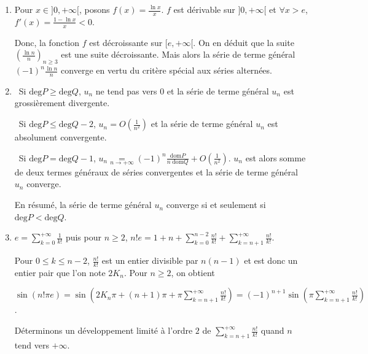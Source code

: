 {{\begin{enumerate}
Ainsi, la série de terme général $u_n$ vérifie le critère de \textsc{Cauchy} et est donc convergente.
Il en est de même des séries de termes généraux respectifs  $\frac{\cos(n\alpha)}{n}=\text{Re}\left(\frac{e^{in\alpha}}{n}\right)$ et $\frac{\sin(n\alpha)}{n}=\text{Im}\left(\frac{e^{in\alpha}}{n}\right)$.

\item  Pour $x\in]0,+\infty[$, posons $f(x)=\frac{\ln x}{x}$. $f$ est dérivable sur $]0,+\infty[$ et $\forall x>e$, $f'(x)=\frac{1-\ln x}{x}< 0$.

Donc, la fonction $f$ est décroissante sur $[e,+\infty[$. On en déduit que la suite $\left(\frac{\ln n}{n}\right)_{n\geqslant3}$ est une suite décroissante. Mais alors la série de terme général $(-1)^n\frac{\ln n}{n}$ converge en vertu du critère spécial aux séries alternées.

\item  \textbullet~Si $\text{deg}P\geqslant\text{deg}Q$, $u_n$ ne tend pas vers $0$ et la série de terme général $u_n$ est grossièrement divergente.

\textbullet~Si $\text{deg}P\leqslant\text{deg}Q - 2$, $u_n=O\left(\frac{1}{n^2}\right)$ et la série de terme général $u_n$ est absolument convergente.

\textbullet~Si $\text{deg}P =\text{deg}Q - 1$, $u_n\underset{n\rightarrow+\infty}{=}(-1)^n\frac{\text{dom}P}{n\;\text{dom}Q}+O\left(\frac{1}{n^2}\right)$. $u_n$ est alors somme de deux termes généraux de séries convergentes et la série de terme général $u_n$ converge.

En résumé, la série de terme général $u_n$ converge si et seulement si $\text{deg}P <\text{deg}Q$.

\item  $e=\sum_{k=0}^{+\infty}\frac{1}{k!}$  puis pour $n\geqslant2$, $n!e=1+ n+\sum_{k=0}^{n-2}\frac{n!}{k!}+\sum_{k=n+1}^{+\infty}\frac{n!}{k!}$.

Pour $0\leqslant k\leqslant n-2$, $\frac{n!}{k!}$ est un entier divisible par $n(n-1)$ et est donc un entier pair que l'on note $2K_n$. Pour $n\geqslant2$, on obtient

\begin{center}
$\sin(n!\pi e)=\sin\left(2K_n\pi+(n+1)\pi+\pi\sum_{k=n+1}^{+\infty}\frac{n!}{k!}\right)=(-1)^{n+1}\sin\left(\pi\sum_{k=n+1}^{+\infty}\frac{n!}{k!}\right)$.
\end{center}

Déterminons un développement limité à l'ordre $2$ de $\sum_{k=n+1}^{+\infty}\frac{n!}{k!}$ quand $n$ tend vers $+\infty$.


\end{enumerate}}}
